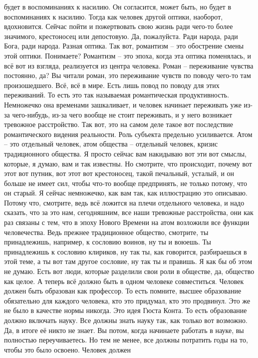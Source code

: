 будет в воспоминаниях к насилию. Он согласится, может быть, но будет в
воспоминаниях к насилию. Тогда как человек другой оптики, наоборот, вдохновится.
Сейчас пойти и пожертвовать свою жизнь ради чего-то более значимого, крестоносец
или депостовую. Да, пожалуйста. Ради народа, ради Бога, ради народа. Разная
оптика. Так вот, романтизм – это обострение смены этой оптики. Понимаете?
Романтизм – это эпоха, когда эта оптика поменялась, и всё вот из взгляда,
реализуется из центра человека. Роман – переживание чувства постоянно, да? Вы
читали роман, это переживание чувств по поводу чего-то там произошедшего. Всё,
всё в мире. Есть лишь повод по поводу для этих переживаний. То есть это так
называемая романтическая продуктивность. Немножечко она временами зашкаливает, и
человек начинает переживать уже из-за чего-нибудь, из-за чего вообще не стоит
переживать, и у него возникает тревожное расстройство. Так вот, это на самом
деле такое вот последствие романтического видения реальности. Роль субъекта
предельно усиливается. Атом – это отдельный человек, атом общества – отдельный
человек, кризис традиционного общества. Я просто сейчас вам накидываю вот эти
вот смыслы, которые, я думаю, вам и так известны. Но смотрите, что происходит,
почему вот этот вот путник, вот этот вот крестоносец, такой печальный, усталый,
и он больше не имеет сил, чтобы что-то вообще предпринять, не только потому, что
он старый. Я сейчас немножечко, как вам так, как иллюстрацию это описываю.
Потому что, смотрите, ведь всё ложится на плечи отдельного человека, и надо
сказать, что за это нам, сегодняшним, все наши тревожные расстройства, они как
раз связаны с тем, что в эпоху Нового Времени на атом возложили все функции
человечества. Ведь прежнее традиционное общество, смотрите, ты принадлежишь,
например, к сословию воинов, ну ты и воюешь. Ты принадлежишь к сословию
клириков, ну так ты, как говорится, разбираешься в этой теме, а ты вот там
другое сословие, ну так ты и правишь. Я как бы об этом не думаю. Есть вот люди,
которые разделили свои роли в обществе, да, общество как целое. А теперь всё
должно быть в одном человеке совместиться. Человек должен быть образован как
профессор. То есть помните, высшее образование обязательно для каждого человека,
кто это придумал, кто это продвинул. Это же не было в качестве нормы никогда.
Это идея Гюста Конта. То есть образование должно включать науку. Все должны
знать науку так, как только вот возможно. Да, в итоге её никто не знает. Вы
потом, когда начинаете работать в науке, вы полностью переучиваетесь. Но тем не
менее, все должны потратить годы на то, чтобы это было освоено. Человек должен
